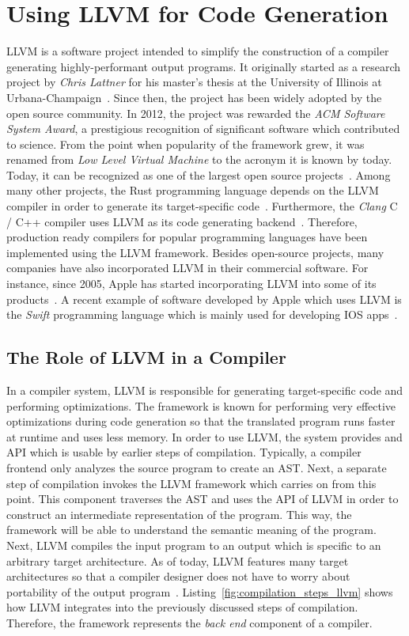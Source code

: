 \section{Using LLVM for Code Generation}

LLVM is a software project intended to simplify the construction of a compiler generating highly-performant output programs.
It originally started as a research project by \emph{Chris Lattner} for his master's thesis at the University of Illinois at Urbana-Champaign~\cite{Lattner:MSThesis02}.
Since then, the project has been widely adopted by the open source community.
In 2012, the project was rewarded the \emph{ACM Software System Award}, a prestigious recognition of significant software which contributed to science.
From the point when popularity of the framework grew, it was renamed from \emph{Low Level Virtual Machine} to the acronym it is known by today.
Today, it can be recognized as one of the largest open source projects~\cite[preface]{Cardoso_Lopes2014-jt}.
Among many other projects, the Rust programming language depends on the LLVM compiler in order to generate its target-specific code~\cite[p.~373]{McNamara2021-hz}.
Furthermore, the \emph{Clang} C / C++ compiler uses LLVM as its code generating backend~\cite[preface]{Hsu2021-ez}.
Therefore, production ready compilers for popular programming languages have been implemented using the LLVM framework.
Besides open-source projects, many companies have also incorporated LLVM in their commercial software.
For instance, since 2005, Apple has started incorporating LLVM into some of its products~\cite[pp.~11-15]{Fandrey}.
A recent example of software developed by Apple which uses LLVM is the \emph{Swift} programming language which is mainly used for developing IOS apps~\cite[preface]{Hsu2021-ez}.

\subsection{The Role of LLVM in a Compiler}

In a compiler system, LLVM is responsible for generating target-specific code and performing optimizations.
The framework is known for performing very effective optimizations during code generation so that the translated program runs faster at runtime and uses less memory.
In order to use LLVM, the system provides and API which is usable by earlier steps of compilation.
Typically, a compiler frontend only analyzes the source program to create an AST.
Next, a separate step of compilation invokes the LLVM framework which carries on from this point\@.
This component traverses the AST and uses the API of LLVM in order to construct an intermediate representation of the program.
This way, the framework will be able to understand the semantic meaning of the program.
Next, LLVM compiles the input program to an output which is specific to an arbitrary target architecture.
As of today, LLVM features many target architectures so that a compiler designer does not have to worry about portability of the output program~\cite[preface]{Hsu2021-ez}.
Listing~\ref{fig:compilation_steps_llvm} shows how LLVM integrates into the previously discussed steps of compilation.
Therefore, the framework represents the \emph{back end} component of a compiler.


